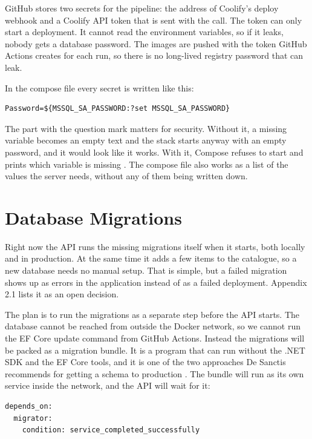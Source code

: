 \documentclass[a4paper,11pt]{article}
\begin{document}
GitHub stores two secrets for the pipeline: the address of Coolify's deploy webhook and a Coolify API token that is sent with the call. The token can only start a deployment. It cannot read the environment variables, so if it leaks, nobody gets a database password. The images are pushed with the token GitHub Actions creates for each run, so there is no long-lived registry password that can leak.

In the compose file every secret is written like this:

\begin{lstlisting}
Password=${MSSQL_SA_PASSWORD:?set MSSQL_SA_PASSWORD}
\end{lstlisting}

The part with the question mark matters for security. Without it, a missing variable becomes an empty text and the stack starts anyway with an empty password, and it would look like it works. With it, Compose refuses to start and prints which variable is missing \cite{docker-compose-interpolation}. The compose file also works as a list of the values the server needs, without any of them being written down.

\section{Database Migrations}\label{sec:migrations}
Right now the API runs the missing migrations itself when it starts, both locally and in production. At the same time it adds a few items to the catalogue, so a new database needs no manual setup. That is simple, but a failed migration shows up as errors in the application instead of as a failed deployment. Appendix 2.1 lists it as an open decision.

The plan is to run the migrations as a separate step before the API starts. The database cannot be reached from outside the Docker network, so we cannot run the EF Core update command from GitHub Actions. Instead the migrations will be packed as a migration bundle. It is a program that can run without the .NET SDK and the EF Core tools, and it is one of the two approaches De Sanctis recommends for getting a schema to production \cite[sec.~12.4.4]{desanctis-web-apis-aspnet-core}. The bundle will run as its own service inside the network, and the API will wait for it:

\begin{lstlisting}
depends_on:
  migrator:
    condition: service_completed_successfully
\end{lstlisting}
\end{document}
